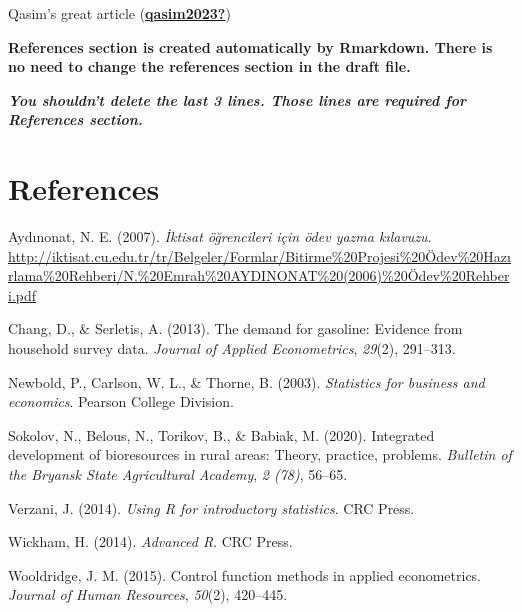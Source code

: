 \documentclass[
  12pt,
]{article}
\newlength{\cslhangindent}
\newlength{\cslentryspacingunit} %
\newenvironment{CSLReferences}[2] %
 {%
  \setlength{\parindent}{0pt}
  \ifodd #1
  \let\oldpar\par
  \def\par{\hangindent=\cslhangindent\oldpar}
  \fi
  \setlength{\parskip}{#2\cslentryspacingunit}
 }%
 {}
\begin{document}
Qasim's great article (\protect\hyperlink{ref-qasim2023}{\textbf{qasim2023?}})

\textbf{References section is created automatically by Rmarkdown. There is no need to change the references section in the draft file.}

\textbf{\emph{You shouldn't delete the last 3 lines. Those lines are required for References section.}}

\newpage

\hypertarget{references}{%
\section{References}\label{references}}

\hypertarget{refs}{}
\begin{CSLReferences}{1}{0}
\leavevmode{}%
Aydınonat, N. E. (2007). \emph{İktisat öğrencileri için ödev yazma kılavuzu}. \url{http://iktisat.cu.edu.tr/tr/Belgeler/Formlar/Bitirme\%20Projesi\%20Ödev\%20Hazırlama\%20Rehberi/N.\%20Emrah\%20AYDINONAT\%20(2006)\%20Ödev\%20Rehberi.pdf}

\leavevmode{}%
Chang, D., \& Serletis, A. (2013). The demand for gasoline: Evidence from household survey data. \emph{Journal of Applied Econometrics}, \emph{29}(2), 291--313.

\leavevmode{}%
Newbold, P., Carlson, W. L., \& Thorne, B. (2003). \emph{Statistics for business and economics}. Pearson College Division.

\leavevmode{}%
Sokolov, N., Belous, N., Torikov, B., \& Babiak, M. (2020). Integrated development of bioresources in rural areas: Theory, practice, problems. \emph{Bulletin of the Bryansk State Agricultural Academy}, \emph{2 (78)}, 56--65.

\leavevmode{}%
Verzani, J. (2014). \emph{Using {R} for introductory statistics}. CRC Press.

\leavevmode{}%
Wickham, H. (2014). \emph{Advanced {R}}. CRC Press.

\leavevmode{}%
Wooldridge, J. M. (2015). Control function methods in applied econometrics. \emph{Journal of Human Resources}, \emph{50}(2), 420--445.

\end{CSLReferences}
\end{document}
